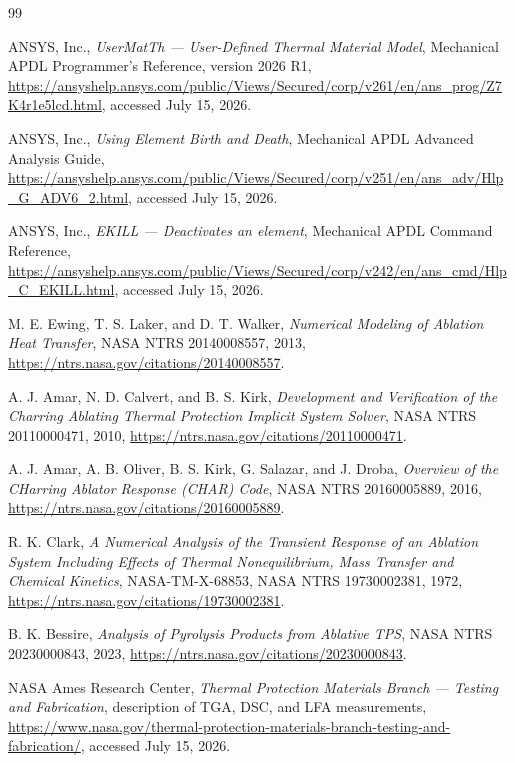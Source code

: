 \documentclass[oneside,openany]{amsdtx}
\begin{document}
\begin{thebibliography}{99}

ANSYS, Inc., \emph{UserMatTh --- User-Defined Thermal Material Model},
Mechanical APDL Programmer's Reference, version 2026 R1,
\url{https://ansyshelp.ansys.com/public/Views/Secured/corp/v261/en/ans_prog/Z7K4r1e5lcd.html},
accessed July 15, 2026.

ANSYS, Inc., \emph{Using Element Birth and Death}, Mechanical APDL Advanced
Analysis Guide,
\url{https://ansyshelp.ansys.com/public/Views/Secured/corp/v251/en/ans_adv/Hlp_G_ADV6_2.html},
accessed July 15, 2026.

ANSYS, Inc., \emph{EKILL --- Deactivates an element}, Mechanical APDL Command
Reference,
\url{https://ansyshelp.ansys.com/public/Views/Secured/corp/v242/en/ans_cmd/Hlp_C_EKILL.html},
accessed July 15, 2026.

M. E. Ewing, T. S. Laker, and D. T. Walker, \emph{Numerical Modeling of
Ablation Heat Transfer}, NASA NTRS 20140008557, 2013,
\url{https://ntrs.nasa.gov/citations/20140008557}.

A. J. Amar, N. D. Calvert, and B. S. Kirk, \emph{Development and Verification of
the Charring Ablating Thermal Protection Implicit System Solver}, NASA NTRS
20110000471, 2010,
\url{https://ntrs.nasa.gov/citations/20110000471}.

A. J. Amar, A. B. Oliver, B. S. Kirk, G. Salazar, and J. Droba,
\emph{Overview of the CHarring Ablator Response (CHAR) Code}, NASA NTRS
20160005889, 2016,
\url{https://ntrs.nasa.gov/citations/20160005889}.

R. K. Clark, \emph{A Numerical Analysis of the Transient Response of an
Ablation System Including Effects of Thermal Nonequilibrium, Mass Transfer and
Chemical Kinetics}, NASA-TM-X-68853, NASA NTRS 19730002381, 1972,
\url{https://ntrs.nasa.gov/citations/19730002381}.

B. K. Bessire, \emph{Analysis of Pyrolysis Products from Ablative TPS}, NASA
NTRS 20230000843, 2023,
\url{https://ntrs.nasa.gov/citations/20230000843}.

NASA Ames Research Center, \emph{Thermal Protection Materials Branch ---
Testing and Fabrication}, description of TGA, DSC, and LFA measurements,
\url{https://www.nasa.gov/thermal-protection-materials-branch-testing-and-fabrication/},
accessed July 15, 2026.


\end{thebibliography}
\end{document}
